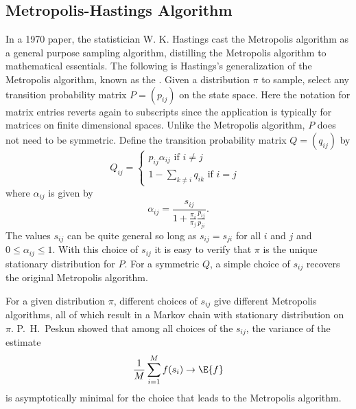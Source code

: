 \documentclass[12pt]{article}
\begin{document}
\subsection*{Metropolis-Hastings Algorithm}

In a 1970 paper, the statistician W. K. Hastings cast the Metropolis
algorithm as a general purpose sampling algorithm, distilling the
Metropolis algorithm to mathematical essentials.  The following is
Hastings's generalization of the Metropolis algorithm, known as the
.%
Given a distribution \( \pi \) to sample, select any transition
probability matrix \( P = (p_{ij}) \) on the state space.  Here the
notation for matrix entries reverts again to subscripts since the
application is typically for matrices on finite dimensional spaces.
Unlike the Metropolis algorithm, \( P \) does not need to be symmetric.
Define the transition probability matrix \( Q= (q_{ij}) \) by
\[
    Q_{ij} =
    \begin{cases}
        p_{ij} \alpha_{ij} \text{ if \(i \ne j\) } \\
        1 - \sum\limits_{k \ne i} q_{ik} \text{ if \(i = j\) }
    \end{cases}
\] where \( \alpha_{ij} \) is given by
\[
    \alpha_{ij} = \frac{s_{ij}}{1 + \frac{\pi_i}{\pi_j} \frac{p_{ij}}{p_
    {ji}}}.
\] The values \( s_{ij} \) can be quite general so long as \( s_{ij} = s_
{ji} \) for all \( i \) and \( j \) and \( 0 \le \alpha_{ij} \le 1 \).
With this choice of \( s_{ij} \) it is easy to verify that \( \pi \) is
the unique stationary distribution for \( P \).  For a symmetric \( Q \),
a simple choice of \( s_{ij} \) recovers the original Metropolis
algorithm.

For a given distribution \( \pi \), different choices of \( s_{ij} \)
give different Metropolis algorithms, all of which result in a
Markov chain with stationary distribution on \( \pi \).  P.\ H.\ Peskun
showed that among all choices of the \( s_{ij} \), the variance of the
estimate
\[
    \frac{1}{M} \sum\limits_{i=1}^M f(s_i) \to \E{f}
\] is asymptotically minimal for the choice that leads to the Metropolis
algorithm.
\end{document}
